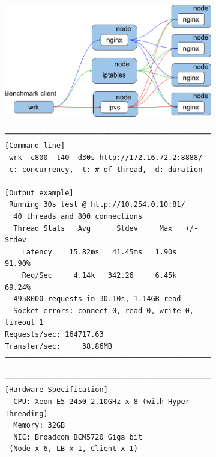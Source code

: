 \begin{figure}[tb]

  \begin{subfigure}[t]{\columnwidth}
    \includegraphics[width=0.9\columnwidth]{Figs/lb_single_schem}
    \caption{}
    \label{fig:lb_single_schem}
  \end{subfigure}

  \par\bigskip

  \begin{subfigure}[t]{\columnwidth}

\centering
\begin{Verbatim}[commandchars=\\\{\}]
───────────────────────────────────────────────────────
[Command line]
 wrk -c800 -t40 -d30s http://172.16.72.2:8888/
-c: concurrency, -t: # of thread, -d: duration

[Output example]
 Running 30s test @ http://10.254.0.10:81/
  40 threads and 800 connections
  Thread Stats   Avg      Stdev     Max   +/- Stdev
    Latency    15.82ms   41.45ms   1.90s    91.90%
    Req/Sec     4.14k   342.26     6.45k    69.24%
  4958000 requests in 30.10s, 1.14GB read
  Socket errors: connect 0, read 0, write 0, timeout 1
Requests/sec: 164717.63
Transfer/sec:     38.86MB
───────────────────────────────────────────────────────
\end{Verbatim}

    \caption{}
    \label{fig:bench_example}
  \end{subfigure}

  \begin{subfigure}[t]{\columnwidth}
\begin{Verbatim}[commandchars=\\\{\}]
───────────────────────────────────────────────────────
[Hardware Specification]
  CPU: Xeon E5-2450 2.10GHz x 8 (with Hyper Threading) 
  Memory: 32GB
  NIC: Broadcom BCM5720 Giga bit 
 (Node x 6, LB x 1, Client x 1)


\end{Verbatim}
\end{subfigure}
\end{figure}
